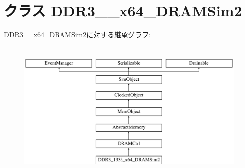 \hypertarget{classDRAMCtrl_1_1DDR3__1333__x64__DRAMSim2}{
\section{クラス DDR3\_\_\-x64\_\-DRAMSim2}
\label{classDRAMCtrl_1_1DDR3__1333__x64__DRAMSim2}
}
DDR3\_\_\-x64\_\-DRAMSim2に対する継承グラフ:\begin{figure}[H]
\begin{center}
\leavevmode
\includegraphics[height=7cm]{classDRAMCtrl_1_1DDR3__1333__x64__DRAMSim2}
\end{center}
\end{figure}
